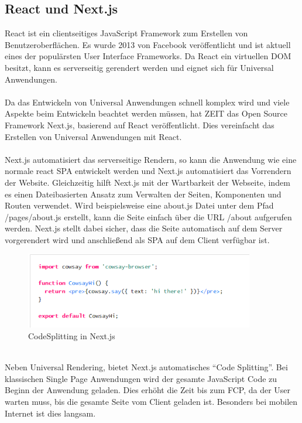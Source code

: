 \documentclass[runningheads]{llncs}
\begin{document}
\subsection{React und Next.js}
\label{subsec:React und Next.js}
React ist ein clientseitiges JavaScript Framework zum Erstellen von Benutzeroberflächen. 
Es wurde 2013 von Facebook veröffentlicht und ist aktuell eines der populärsten User Interface Frameworks. 
Da React ein virtuellen DOM besitzt, 
kann es serverseitig gerendert werden und eignet sich für Universal Anwendungen.
\\
\\
Da das Entwickeln von Universal Anwendungen schnell komplex wird und 
viele Aspekte beim Entwickeln beachtet werden müssen, 
hat ZEIT das Open Source Framework Next.js, 
basierend auf React veröffentlicht. 
Dies vereinfacht das Erstellen von Universal Anwendungen mit React.
\\
\\
Next.js automatisiert das serverseitige Rendern, 
so kann die Anwendung wie eine normale react SPA entwickelt werden und 
Next.js automatisiert das Vorrendern der Website. 
Gleichzeitig hilft Next.js mit der Wartbarkeit der Webseite, 
indem es einen Dateibasierten Ansatz zum Verwalten der Seiten, 
Komponenten und Routen verwendet. 
Wird beispielsweise eine about.js Datei unter dem Pfad /pages/about.js erstellt, 
kann die Seite einfach über die URL /about aufgerufen werden. 
Next.js stellt dabei sicher, 
dass die Seite automatisch auf dem Server vorgerendert wird und 
anschließend als SPA auf dem Client verfügbar ist. 
\begin{figure}
  \centering
  \includegraphics[width=10cm]{images/CodeSplitting}
  \caption{CodeSplitting in Next.js \cite{arunoda}}
  \label{CodeSplitting in Next.js}
\end{figure}
\\
Neben Universal Rendering, bietet Next.js automatisches “Code Splitting”. 
Bei klassischen Single Page Anwendungen wird der gesamte JavaScript Code 
zu Beginn der Anwendung geladen. 
Dies erhöht die Zeit bis zum FCP, da der User warten muss, 
bis die gesamte Seite vom Client geladen ist. 
Besonders bei mobilen Internet ist dies langsam. 
\end{document}
